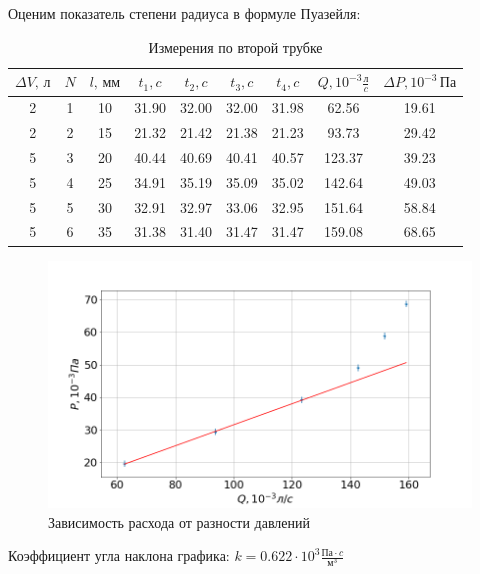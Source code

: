 \documentclass[a4paper, fontsize=14pt]{article}
\begin{document}
Оценим показатель степени радиуса в формуле Пуазейля:
 
 \begin{table}[H]
 	\centering
 	\begin{tabular}{|c|c|c|c|c|c|c|c|c|} \hline
  $\Delta V, \, \text{л}$ &   $N$ &   $l,\, \text{мм}$ &     $t_1, c$ &     $t_2, c$ &     $t_3, c$ &     $t_4, c$ &  $ Q, 10^{-3} \frac{\text{л}}{c} $ & $\Delta P, 10^{-3}\, \text{Па}$ \\\hline
  2 &  1 &  10 &  31.90 &  32.00 &  32.00 &  31.98 &   62.56 &  19.61 \\\hline
  2 &  2 &  15 &  21.32 &  21.42 &  21.38 &  21.23 &   93.73 &  29.42 \\\hline
  5 &  3 &  20 &  40.44 &  40.69 &  40.41 &  40.57 &  123.37 &  39.23 \\\hline
  5 &  4 &  25 &  34.91 &  35.19 &  35.09 &  35.02 &  142.64 &  49.03 \\\hline
  5 &  5 &  30 &  32.91 &  32.97 &  33.06 &  32.95 &  151.64 &  58.84 \\\hline
  5 &  6 &  35 &  31.38 &  31.40 &  31.47 &  31.47 &  159.08 &  68.65 \\\hline
	\end{tabular}
	\caption{Измерения по второй трубке}

 \end{table}
 \begin{figure}[H]
\center
\includegraphics[scale=0.4]{PQ2.png}
\caption{Зависимость расхода от разности давлений}
\end{figure}

Коэффициент угла наклона графика: $k = 0.622 \cdot 10^{3} \frac{\text{Па} \cdot c}{\text{м}^3}$
 
\end{document}
